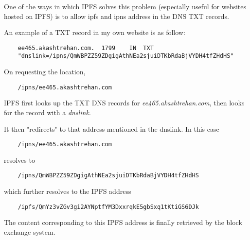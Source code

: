One of the ways in which IPFS solves this problem (especially useful for websites hosted on IPFS) is to allow ipfs and ipns address in the DNS TXT records.

An example of a TXT record in my own website is as follow:

\begin{verbatim}
    ee465.akashtrehan.com.  1799    IN  TXT
    "dnslink=/ipns/QmWBPZZ59ZDgigAthNEa2sjuiDTKbRdaBjVYDH4tfZHdHS"
\end{verbatim}

On requesting the location,

\begin{verbatim}
    /ipns/ee465.akashtrehan.com
\end{verbatim}

IPFS first looks up the TXT DNS records for \textit{ee465.akashtrehan.com}, then looks for the record with a \textit{dnslink}.

It then "redirects" to that address mentioned in the dnslink. In this case \begin{verbatim}
    /ipns/ee465.akashtrehan.com
\end{verbatim}
resolves to 

\begin{verbatim}
    /ipns/QmWBPZZ59ZDgigAthNEa2sjuiDTKbRdaBjVYDH4tfZHdHS
\end{verbatim}

which further resolves to the IPFS address
\begin{verbatim}
    /ipfs/QmYz3vZGv3gi2AYNptfYM3DxxrqkE5gbSxq1tKtiGS6DJk
\end{verbatim}

The content corresponding to this IPFS address is finally retrieved by the block exchange system.
